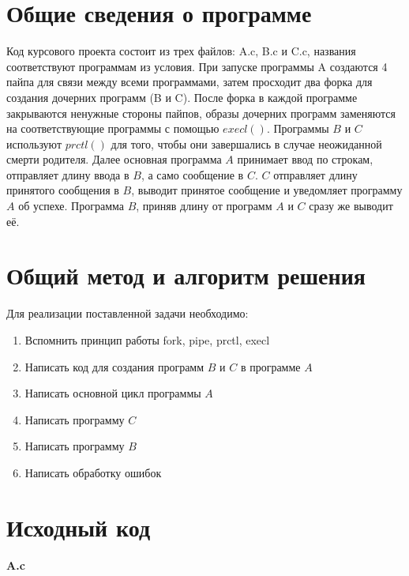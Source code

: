 \section{Общие сведения о программе}

Код курсового проекта состоит из трех файлов: A.c, B.c и C.c, названия соответствуют программам из условия. При запуске программы A создаются 4 пайпа для связи между всеми программами, затем просходит два форка для создания дочерних программ (B и C). После форка в каждой программе закрываются ненужные стороны пайпов, образы дочерних программ заменяются на соответствующие программы с помощью $execl()$. Программы $B$ и $C$ используют $prctl()$ для того, чтобы они завершались в случае неожиданной смерти родителя. Далее основная программа $A$ принимает ввод по строкам, отправляет длину ввода в $B$, а само сообщение в $C$. $C$ отправляет длину принятого сообщения в $B$, выводит принятое сообщение и уведомляет программу $A$ об успехе. Программа $B$, приняв длину от программ $A$ и $C$ сразу же выводит её.

\pagebreak

\section{Общий метод и алгоритм решения}

Для реализации поставленной задачи необходимо:

\begin{enumerate}
    \item Вспомнить принцип работы fork, pipe, prctl, execl
    \item Написать код для создания программ $B$ и $C$ в программе $A$
    \item Написать основной цикл программы $A$
    \item Написать программу $C$
    \item Написать программу $B$
    \item Написать обработку ошибок
\end{enumerate}

\pagebreak

\section{Исходный код}

\textbf{A.c}

